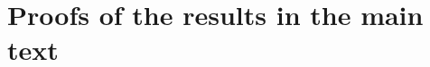 \documentclass[11pt,twoside]{article} %
\begin{document}
%
%

%
%
%
%




\section{Proofs of the results in the main text}
\label{app:proofs_main}
\end{document}
